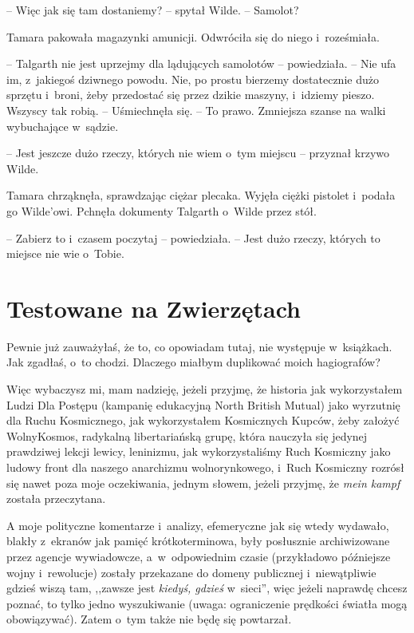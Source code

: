 \documentclass[oneside,polish,11pt,sfheadings]{mwbk}
\begin{document}
-- Więc jak się tam dostaniemy? -- spytał Wilde. -- Samolot?

Tamara pakowała magazynki amunicji. Odwróciła się do niego i~roześmiała.

-- Talgarth nie jest uprzejmy dla lądujących samolotów -- powiedziała. -- Nie ufa im, z~jakiegoś dziwnego powodu. Nie, po prostu bierzemy
dostatecznie dużo sprzętu i~broni, żeby przedostać się przez dzikie
maszyny, i~idziemy pieszo. Wszyscy tak robią. -- Uśmiechnęła się. -- To
prawo. Zmniejsza szanse na walki wybuchające w~sądzie.

-- Jest jeszcze dużo rzeczy, których nie wiem o~tym miejscu -- przyznał
krzywo Wilde.

Tamara chrząknęła, sprawdzając ciężar plecaka. Wyjęła ciężki pistolet i~podała go Wilde'owi. Pchnęła dokumenty Talgarth o~Wilde przez stół.

-- Zabierz to i~czasem poczytaj -- powiedziała. -- Jest dużo rzeczy,
których to miejsce nie wie o~Tobie.

\chapter{Testowane na Zwierzętach}

Pewnie już zauważyłaś, że to, co opowiadam tutaj, nie występuje w~książkach. Jak zgadłaś, o~to chodzi. Dlaczego miałbym duplikować moich
hagiografów?

Więc wybaczysz mi, mam nadzieję, jeżeli przyjmę, że historia jak
wykorzystałem Ludzi Dla Postępu (kampanię edukacyjną North British
Mutual) jako wyrzutnię dla Ruchu Kosmicznego, jak wykorzystałem
Kosmicznych Kupców, żeby założyć WolnyKosmos, radykalną libertariańską
grupę, która nauczyła się jedynej prawdziwej lekcji lewicy, leninizmu,
jak wykorzystaliśmy Ruch Kosmiczny jako ludowy front dla naszego
anarchizmu wolnorynkowego, i~Ruch Kosmiczny rozrósł się nawet poza moje
oczekiwania, jednym słowem, jeżeli przyjmę, że \emph{mein kampf} została
przeczytana.

A moje polityczne komentarze i~analizy, efemeryczne jak się wtedy
wydawało, blakły z~ekranów jak pamięć krótkoterminowa, były posłusznie
archiwizowane przez agencje wywiadowcze, a~w~odpowiednim czasie
(przykładowo późniejsze wojny i~rewolucje) zostały przekazane do domeny
publicznej i~niewątpliwie gdzieś wiszą tam, ,,zawsze jest \emph{kiedyś,
gdzieś} w~sieci'', więc jeżeli naprawdę chcesz poznać, to tylko jedno
wyszukiwanie (uwaga: ograniczenie prędkości światła mogą obowiązywać).
Zatem o~tym także nie będę się powtarzał.
\end{document}
